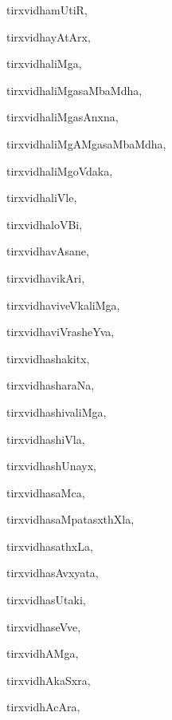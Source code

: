 \begin{multicols}{3}
{\noindent
{tirxvidhamUtiR}, \pageref{tirxvidhamUtiR}

\noindent
{tirxvidhayAtArx}, \pageref{tirxvidhayAtArx}

\noindent
{tirxvidhaliMga}, \pageref{tirxvidhaliMga}

\noindent
{tirxvidhaliMgasaMbaMdha}, \pageref{tirxvidhaliMgasaMbaMdha}

\noindent
{tirxvidhaliMgasAnxna}, \pageref{tirxvidhaliMgasAnxna}

\noindent
{tirxvidhaliMgAMgasaMbaMdha}, \pageref{tirxvidhaliMgAMgasaMbaMdha}

\noindent
{tirxvidhaliMgoVdaka}, \pageref{tirxvidhaliMgoVdaka}

\noindent
{tirxvidhaliVle}, \pageref{tirxvidhaliVle}

\noindent
{tirxvidhaloVBi}, \pageref{tirxvidhaloVBi}

\noindent
{tirxvidhavAsane}, \pageref{tirxvidhavAsane}

\noindent
{tirxvidhavikAri}, \pageref{tirxvidhavikAri}

\noindent
{tirxvidhaviveVkaliMga}, \pageref{tirxvidhaviveVkaliMga}

\noindent
{tirxvidhaviVrasheYva}, \pageref{tirxvidhaviVrasheYva}

\noindent
{tirxvidhashakitx}, \pageref{tirxvidhashakitx}

\noindent
{tirxvidhasharaNa}, \pageref{tirxvidhasharaNa}

\noindent
{tirxvidhashivaliMga}, \pageref{tirxvidhashivaliMga}

\noindent
{tirxvidhashiVla}, \pageref{tirxvidhashiVla}

\noindent
{tirxvidhashUnayx}, \pageref{tirxvidhashUnayx}

\noindent
{tirxvidhasaMca}, \pageref{tirxvidhasaMca}

\noindent
{tirxvidhasaMpatasxthXla}, \pageref{tirxvidhasaMpatasxthXla}

\noindent
{tirxvidhasathxLa}, \pageref{tirxvidhasathxLa}

\noindent
{tirxvidhasAvxyata}, \pageref{tirxvidhasAvxyata}

\noindent
{tirxvidhasUtaki}, \pageref{tirxvidhasUtaki}

\noindent
{tirxvidhaseVve}, \pageref{tirxvidhaseVve}

\noindent
{tirxvidhAMga}, \pageref{tirxvidhAMga}

\noindent
{tirxvidhAkaSxra}, \pageref{tirxvidhAkaSxra}

\noindent
{tirxvidhAcAra}, \pageref{tirxvidhAcAra}

}
\end{multicols}
